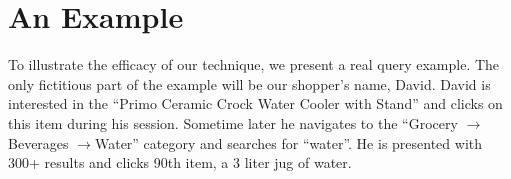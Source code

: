 \documentclass{article}
\begin{document}
\section{An Example}





To illustrate the efficacy of our technique, we present a real query example.
The only fictitious part of the example will be our shopper's name, David.
David is interested in the ``Primo Ceramic Crock Water Cooler with Stand'' and
clicks on this item during his session. Sometime later he navigates to the
``Grocery $\rightarrow $Beverages $\rightarrow $Water'' category and searches
for ``water''. He is presented with 300+ results and clicks 90th item, a 3 liter
jug of water.
\end{document}
